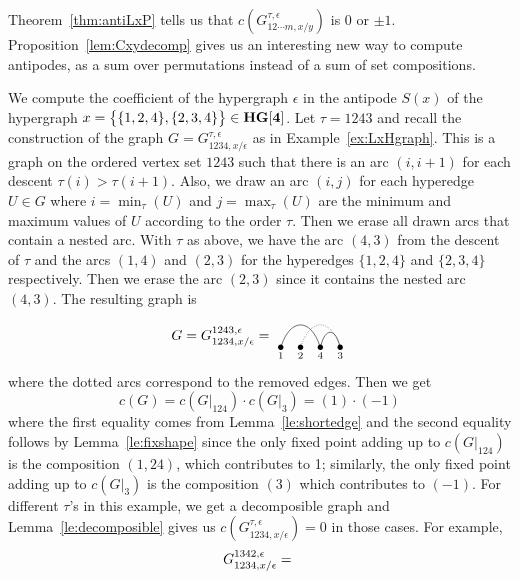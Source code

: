 \documentclass[ALCO,ThmDefs,Unicode,epreuves]{cedram}
\begin{document}
Theorem~\ref{thm:antiLxP} tells us that $c(G_{12\cdots m,x/y}^{\tau,\epsilon})$ is $0$ or $\pm 1$. Proposition~\ref{lem:Cxydecomp} gives us an interesting
new way to compute antipodes, as a sum over permutations instead of a sum of set compositions. 
\begin{exam}\label{ex:twotriangles} We compute the coefficient of the hypergraph $\epsilon$ in the antipode $S(x)$ of the hypergraph $x=\big\{\{1,2,4\},\{2,3,4\}\big\}\in\bf{HG}[4]$. Let $\tau=1243$ and recall the construction of the graph $G=G_{1234,x/\epsilon}^{\tau,\epsilon}$ as in Example~\ref{ex:LxHgraph}. This is a graph on the ordered vertex set $1243$ such that there is an arc $(i,i+1)$ for each descent $\tau(i)>\tau(i+1)$. Also, we draw an arc $(i,j)$ for each hyperedge $U\in G$ where $i=\min_\tau(U)$ and $j=\max_\tau(U)$ are the minimum and maximum values of $U$ according to the order $\tau$. Then we erase all drawn arcs that contain a nested arc.
With $\tau$ as above, we have the arc $(4,3)$ from the descent of $\tau$ and the arcs $(1,4)$ and $(2,3)$ for the hyperedges $\{1,2,4\}$ and $\{2,3,4\}$ respectively. Then we erase the arc $(2,3)$ since it contains the nested arc $(4,3)$. 
The resulting graph is
$$G=G_{1234,x/\epsilon}^{1243,\epsilon}=
\begin{tikzpicture}[baseline=.2cm]
	\foreach \x in {1,2,3,4} 
		\node (\x) at (\x/2,0) [inner sep=-1pt] {$\bullet$};
	\node at (1/2,-.2) {$\scriptstyle 1$};
	\node at (2/2,-.2) {$\scriptstyle 2$};
	\node at (3/2,-.2) {$\scriptstyle 4$};
	\node at (4/2,-.2) {$\scriptstyle 3$};
	\draw (1) .. controls (1.5/2,.75) and (2.5/2,.75) .. (3); 
	\draw [densely dotted] (2) .. controls (2.5/2,.75) and (3.5/2,.75) .. (4); 
	\draw (3) .. controls (3.25/2,.5) and (3.75/2,.5) .. (4); 
\end{tikzpicture} 
$$
where the dotted arcs correspond to the removed edges. Then we get $$c(G)=c(G|_{124})\cdot c(G|_3)=(1)\cdot(-1)$$
where the first equality comes from Lemma~\ref{le:shortedge} and the second equality follows by Lemma~\ref{le:fixshape} since the only fixed point adding up to $c(G|_{124})$ is the composition $(1,24)$, which contributes to 1; similarly, the only fixed point adding up to $c(G|_3)$ is the composition $(3)$ which contributes to $(-1)$.
For different $\tau$'s in this example, we get a decomposible graph and Lemma~\ref{le:decomposible} gives us $c(G_{1234,x/\epsilon}^{\tau,\epsilon})=0$ in those cases. For example,
$$G_{1234,x/\epsilon}^{1342,\epsilon}=
\begin{tikzpicture}[baseline=.2cm]

\end{tikzpicture}$$
\end{exam}
\end{document}
